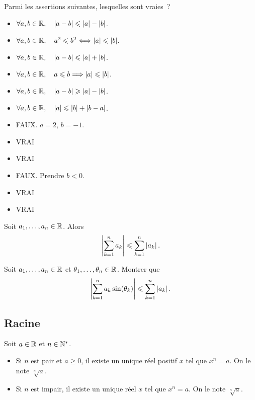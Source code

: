 \documentclass{magnolia}
\begin{document}
\begin{exoUnique}
\exo Parmi les assertions suivantes, lesquelles sont vraies~?
  \begin{multicols}{2}
  \begin{itemize}
  \item $\forall a,b\in\mathbb{R} ,\quad \left|a-b\right|\leqslant\left|a\right|-\left|b\right|$.
  \item $\forall a,b\in\mathbb{R} ,\quad a^2\leqslant b^2 \Longleftrightarrow \left|a\right|\leqslant\left|b\right|$.
  \item $\forall a,b\in\mathbb{R} ,\quad \left|a-b\right|\leqslant\left|a\right|+\left|b\right|$.
  \item $\forall a,b\in\mathbb{R} ,\quad a\leqslant b \Longrightarrow \left|a\right|\leqslant\left|b\right|$.
  \item $\forall a,b\in\mathbb{R} ,\quad \left|a-b\right|\geqslant\left|a\right|-\left|b\right|$.
  \item $\forall a,b\in\mathbb{R} ,\quad \left|a\right|\leqslant\left|b\right|+\left|b-a\right|$.
  \end{itemize}  
  \end{multicols}
\end{exoUnique}
\begin{sol}
\begin{itemize}
  \item FAUX. $a=2$, $b=-1$.
  \item VRAI
  \item VRAI
  \item FAUX. Prendre $b<0$.
  \item VRAI
  \item VRAI
  \end{itemize}  
  \end{sol}

\begin{proposition}
Soit $a_1,\ldots,a_n\in\mathbb{R}$. Alors
\[\left|\sum_{k=1}^n a_k\right|\leqslant \sum_{k=1}^n \left|a_k\right|.\]
\end{proposition}

\begin{exoUnique}
\exo Soit $a_1,\ldots,a_n\in\mathbb{R}$ et $\theta_1,\ldots,\theta_n\in\mathbb{R}$. Montrer
  que
  \[\left|\sum_{k=1}^n a_k \sin(\theta_k)\right|\leqslant\sum_{k=1}^n \left|a_k\right|.\]
\end{exoUnique}


\subsection{Racine}

\begin{definition}
Soit $a\in\mathbb{R}$ et $n\in{\mathbb{N}^*}$.
\begin{itemize}
\item Si $n$ est pair et $a\geq 0$, il existe un unique réel positif $x$ tel que
  $x^n=a$. On le note $\sqrt[n]{a}$.
\item Si $n$ est impair, il existe un unique réel $x$ tel que
  $x^n=a$. On le note $\sqrt[n]{a}$.
\end{itemize}
\end{definition}
\end{document}
